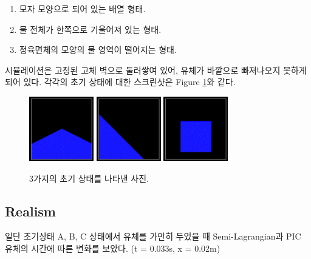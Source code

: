 \documentclass[12pt, A4]{article}
\begin{document}
\begin{enumerate}[label=\Alph*.]
  \item 모자 모양으로 되어 있는 배열 형태.
  \item 물 전체가 한쪽으로 기울어져 있는 형태.
  \item 정육면체의 모양의 물 영역이 떨어지는 형태.
\end{enumerate}

시뮬레이션은 고정된 고체 벽으로 둘러쌓여 있어, 유체가 바깥으로 빠져나오지 못하게 되어 있다. 각각의 초기 상태에 대한 스크린샷은 Figure \ref{fluid-init-state}와 같다.

\begin{figure}[h]
  \centering
\includegraphics[width=0.25\textwidth]{init_state_1}
\includegraphics[width=0.25\textwidth]{init_state_2}
\includegraphics[width=0.25\textwidth]{init_state_3}
  \caption{3가지의 초기 상태를 나타낸 사진.}
  \label{fluid-init-state}
\end{figure}

\subsection{Realism}

일단 초기상태 A, B, C 상태에서 유체를 가만히 두었을 때 Semi-Lagrangian과 PIC 유체의 시간에 따른 변화를 보았다. (\Delta t = 0.033s, \Delta x = 0.02m)
\end{document}
